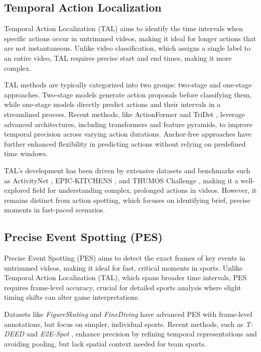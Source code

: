 \documentclass[a4paper,twoside]{article}
\begin{document}
\subsection{Temporal Action Localization}
Temporal Action Localization (TAL) aims to identify the time intervals when specific actions occur in untrimmed videos, making it ideal for longer actions that are not instantaneous. Unlike video classification, which assigns a single label to an entire video, TAL requires precise start and end times, making it more complex.

TAL methods are typically categorized into two groups: two-stage \cite{9578330,10.1007/978-3-319-46487-9_47} and one-stage \cite{10203543,zhang2022actionformer} approaches. Two-stage models generate action proposals before classifying them, while one-stage models directly predict actions and their intervals in a streamlined process. Recent methods, like ActionFormer \cite{zhang2022actionformer} and TriDet \cite{tridet}, leverage advanced architectures, including transformers and feature pyramids, to improve temporal precision across varying action durations. Anchor-free approaches \cite{9171561} have further enhanced flexibility in predicting actions without relying on predefined time windows.

TAL's development has been driven by extensive datasets and benchmarks such as ActivityNet \cite{ActivityNet}, EPIC-KITCHENS \cite{damen2018scalingegocentricvisionepickitchens}, and THUMOS Challenge \cite{Idrees_2017}, making it a well-explored field for understanding complex, prolonged actions in videos. However, it remains distinct from action spotting, which focuses on identifying brief, precise moments in fast-paced scenarios.
\subsection{Precise Event Spotting (PES)}

Precise Event Spotting (PES) aims to detect the exact frames of key events in untrimmed videos, making it ideal for fast, critical moments in sports. Unlike Temporal Action Localization (TAL), which spans broader time intervals, PES requires frame-level accuracy, crucial for detailed sports analysis where slight timing shifts can alter game interpretations.

Datasets like \textit{FigureSkating} \cite{figureskating} and \textit{FineDiving} \cite{finediving} have advanced PES with frame-level annotations, but focus on simpler, individual sports. Recent methods, such as \textit{T-DEED} \cite{tdeed23} and \textit{E2E-Spot} \cite{spot22}, enhance precision by refining temporal representations and avoiding pooling, but lack spatial context needed for team sports.
\end{document}
